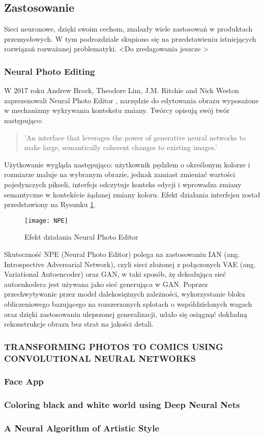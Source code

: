   \subsection{Zastosowanie}
    Sieci neuronowe, dzięki swoim cechom, znalazły wiele zastosowań w produktach
    przemysłowych. W tym podrozdziale skupiono się na przedstawieniu istniejących
    rozwiązań rozważanej problematyki. \textless Do zredagowania jeszcze \textgreater

    \subsubsection{Neural Photo Editing}
      W 2017 roku Andrew Brock, Theodore Lim, J.M. Ritchie and Nick Weston
      zaprezenowali Neural Photo Editor \cite{neural_photo_editor}, narzędzie
      do edytowania obrazu wyposażone w mechanizmy wykrywania kontekstu zmiany.
      Twórcy opisują swój twór następująco:

      \begin{quote}
        'An interface that leverages the power of generative neural networks to
        make large, semantically coherent changes to existing images.'
      \end{quote}

      Użytkowanie wygląda następująco: użytkownik pędzlem o określonym kolorze i
      rozmiarze maluje na wybranym obrazie, jednak zamiast zmieniać wartości
      pojedynczych pikseli, interfejs odczytuje konteks edycji i wprowadza zmiany
      semantyczne w kontekście żądanej zmiany koloru. Efekt działania interfejsu
      został przedstawiony na Rysunku \ref{fig:npe}.

      \begin{figure}[h]
        \centering
        \texttt{[image: NPE]}
        \caption{Efekt działania Neural Photo Editor}
        \label{fig:npe}
      \end{figure}

      Skuteczność NPE (Neural Photo Editor) polega na zastosowaniu IAN
      (ang. Introspective Adversarial Network), czyli sieci złożonej z połączonych
      VAE (ang. Variational Autoencoder) oraz GAN, w taki sposób, żę dekodująca
      sieć autoenkodera jest używana jako sieć generująca w GAN.
      Poprzez przechwytywanie przez model dalekosiężnych zależności, wykorzystanie
      bloku obliczeniowego bazującego na rozszerzonych splotach o
      współdzielonych wagach oraz dzięki zastosowaniu ulepszonej generalizacji,
      udało się osiągnąć dokładną rekonstrukcje obrazu bez strat na jakości detali.


    \subsubsection{TRANSFORMING PHOTOS TO COMICS USING CONVOLUTIONAL NEURAL NETWORKS}

    \subsubsection{Face App}

    \subsubsection{Coloring black and white world using Deep Neural Nets}

    \subsubsection{A Neural Algorithm of Artistic Style}
